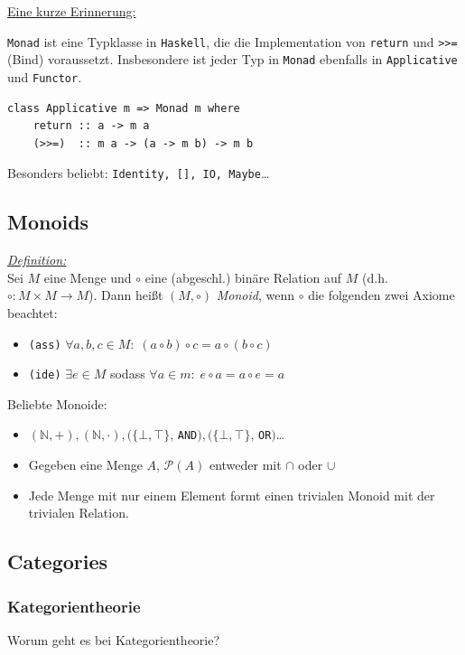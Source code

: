 \documentclass{beamer}
\begin{document}
\begin{frame}[fragile]

\underline{Eine kurze Erinnerung:}\bigskip

\texttt{Monad} ist eine Typklasse in \texttt{Haskell}, die die Implementation von \texttt{return} und \texttt{>>=} (Bind) voraussetzt. Insbesondere ist jeder Typ in \texttt{Monad} ebenfalls in \texttt{Applicative} und \texttt{Functor}.\bigskip

\begin{verbatim}
class Applicative m => Monad m where
    return :: a -> m a
    (>>=)  :: m a -> (a -> m b) -> m b
\end{verbatim}
\pause

Besonders beliebt: \texttt{Identity, [], IO, Maybe}\dots
\end{frame}

\subsection*{Monoids}

\begin{frame}
\underline{\emph{Definition:}}\\ Sei $M$ eine Menge und $\circ$ eine (abgeschl.) binäre Relation auf $M$ (d.h. $\circ : M \times M \to M$). Dann heißt $(M, \circ)$ \emph{Monoid}, wenn $\circ$ die folgenden zwei Axiome beachtet:

\begin{itemize}
\pause \item \texttt{(ass)} $\forall a,b,c \in M:\; (a \circ b) \circ c = a \circ (b \circ c)$
\pause \item \texttt{(ide)} $\exists e \in M$ sodass $\forall a \in m:\; e \circ a = a \circ e = a$
\end{itemize}
\pause\bigskip

Beliebte Monoide:
\begin{itemize}
\pause \item $(\mathbb{N}, +), (\mathbb{N}, \cdot), (\{\bot, \top\}$, \texttt{AND}$), (\{\bot, \top\}$, \texttt{OR}$)$\dots
\pause \item Gegeben eine Menge $A$, $\mathcal{P}(A)$ entweder mit $\cap$ oder $\cup$
\pause \item Jede Menge mit nur einem Element formt einen trivialen Monoid mit der trivialen Relation.
\end{itemize}

\end{frame}

\subsection*{Categories}

\begin{frame}
\frametitle{Kategorientheorie}

Worum geht es bei Kategorientheorie?
\end{frame}
\end{document}
